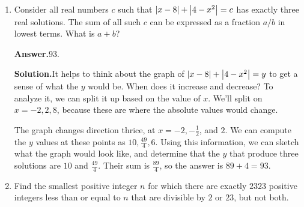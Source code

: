 \documentclass[11pt,paper=letter]{scrartcl}
\newcommand{\ans}[1]{{\sffamily \bfseries Answer.}\;\(\boxed{\text{#1}}\).}
\newcommand{\sol}{{\sffamily \bfseries Solution.}\;}
\begin{document}
\begin{enumerate}[align=left,leftmargin=*,resume]

\item Consider all real numbers $c$ such that $\left\lvert x-8 \right\rvert + \left\lvert 4-x^2 \right\rvert = c$ has exactly three real solutions. The sum of all such $c$ can be expressed as a fraction $a/b$ in lowest terms. What is $a + b$?

\ans{$93$}

\sol It helps to think about the graph of $\left\lvert x-8 \right\rvert + \left\lvert 4-x^2 \right\rvert = y$ to get a sense of what the $y$ would be. When does it increase and decrease? To analyze it, we can split it up based on the value of $x$. We'll split on $x = -2, 2, 8$, because these are where the absolute values would change.


The graph changes direction thrice, at $x = -2, -\frac{1}{2}$, and $2$. We can compute the $y$ values at these points as $10, \frac{49}{4}, 6$. Using this information, we can sketch what the graph would look like, and determine that the $y$ that produce three solutions are $10$ and $\frac{49}{4}$. Their sum is $\frac{89}{4}$, so the answer is $89 + 4 = 93$.

\item Find the smallest positive integer $n$ for which there are exactly $2323$ positive integers less than or equal to $n$ that are divisible by $2$ or $23$, but not both.


\end{enumerate}
\end{document}
